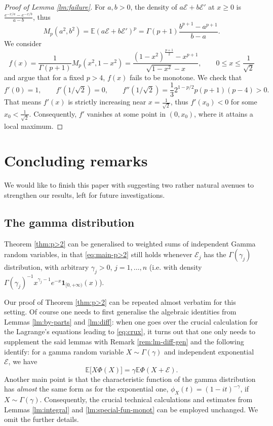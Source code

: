 \documentclass[10pt]{article}
\newcommand{\E}{\mathbb{E}}
\newcommand{\1}{\textbf{1}}
\newcommand{\cE}{\mathscr{E}}
\theoremstyle{remark}
\theoremstyle{definition}
\begin{document}
\begin{proof}[Proof of Lemma \ref{lm:failure}]
For $a, b > 0$, the density of $a\cE + b\cE'$ at $x \geq 0$ is $\frac{e^{-x/a}-e^{-x/b}}{a-b}$, thus
\[ 
M_p(a^2, b^2) = \E(a\cE + b\cE')^p = \Gamma(p+1)\frac{b^{p+1}-a^{p+1}}{b-a}.
 \]
We consider
\[ 
f(x) = \frac{1}{\Gamma(p+1)}M_p(x^2, 1-x^2) = \frac{(1-x^2)^{\frac{p+1}{2}} - x^{p+1}}{\sqrt{1-x^2}-x} , \qquad 0 \leq x \leq \frac{1}{\sqrt{2}}
 \]
and argue that for a fixed $p > 4$, $f(x)$ fails to be monotone. We check that
\[ 
f'(0) = 1, \qquad f'(1/\sqrt{2}) = 0, \qquad f''(1/\sqrt{2}) = \frac{1}{3}2^{1-p/2}p(p+1)(p-4) > 0.
 \]
That means $f'(x)$ is strictly increasing near $x = \frac{1}{\sqrt{2}}$, thus $f'(x_0) < 0$ for some $x_0 < \frac{1}{\sqrt{2}}$. Consequently, $f'$ vanishes at some point in $(0, x_0)$, where it attains a local maximum.
\end{proof}



\section{Concluding remarks}

We would like to finish this paper with suggesting two rather natural avenues to strengthen our results, left for future investigations.


\subsection{The gamma distribution}

Theorem \ref{thm:p>2} can be generalised to weighted sums of independent Gamma random variables, in that \eqref{eq:main-p>2} still holds whenever $\cE_j$ has the $\Gamma(\gamma_j)$ distribution, with arbitrary $\gamma_j > 0$, $j = 1, \dots, n$ (i.e. with density $\Gamma(\gamma_j)^{-1}x^{\gamma_j-1}e^{-x}\1_{[0,+\infty)}(x)$). 

Our proof of Theorem \ref{thm:p>2} can be repeated almost verbatim for this setting. Of course one needs to first generalise the algebraic identities from Lemmas \ref{lm:by-parts} and \ref{lm:diff}: when one goes over the crucial calculation for the Lagrange's equations leading to \eqref{eq:crux}, it turns out that one only needs to supplement the said lemmas with Remark \ref{rem:lm-diff-gen} and the following identify: for a gamma random variable $X \sim \Gamma(\gamma)$ and independent exponential $\cE$, we have
\[ 
\E\Big[X \Phi(X)\Big ] = \gamma\E\Phi(X+\cE).
 \]
Another main point is that the characteristic function of the gamma distribution has \emph{almost} the same form as for the exponential one, $\phi_X(t) = (1-it)^{-\gamma}$, if $X \sim \Gamma(\gamma)$. Consequently, the crucial technical calculations and estimates from Lemmas \ref{lm:integral} and \ref{lm:special-fun-monot} can be employed unchanged. We omit the further details. 
\end{document}

